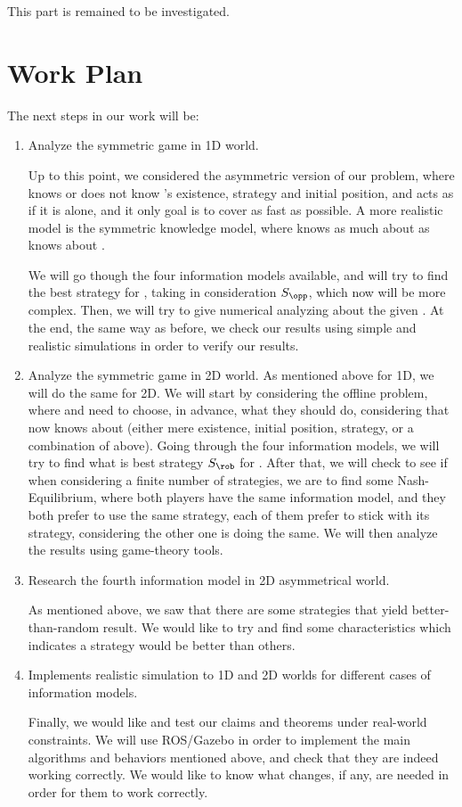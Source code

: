 \documentclass[a4paper,english,10pt]{article}
\begin{document}
This part is remained to be investigated. 

\section{Work Plan}
The next steps in our work will be:
\begin{enumerate}
\item Analyze the symmetric game in 1D world.

Up to this point, we considered the asymmetric version of our problem, where \rob knows or does not know {\opp}'s existence, strategy and initial position, and \opp acts as if it is alone, and it only goal is to cover as fast as possible.
A more realistic model is the symmetric knowledge model, where \opp knows as much about \rob as \rob knows about \opp.

We will go though the four information models available, and will try to find the best strategy for \rob, taking in consideration $S_\opp$, which now will be more complex. Then, we will try to give numerical analyzing about the given \fcc. At the end, the same way as before, we check our results using simple and realistic simulations in order to verify our results.

\item Analyze the symmetric game in 2D world.
As mentioned above for 1D, we will do the same for 2D.
We will start by considering the offline problem, where \rob and \opp need to choose, in advance, what they should do, considering that now \opp knows about \rob (either mere existence, initial position, strategy, or a combination of above).
Going through the four information models, we will try to find what is  best strategy $S_\rob$ for \rob. 
After that, we will check to see if when considering a finite number of strategies, we are to find some Nash-Equilibrium, where both players have the same information model, and they both prefer to use the same strategy, each of them prefer to stick with its strategy, considering the other one is doing the same. We will then analyze the results using game-theory tools.

\item Research the fourth information model in 2D asymmetrical world.

As mentioned above, we saw that there are some strategies that yield better-than-random result. 
We would like to try and find some characteristics which indicates a strategy would be better than others.

\item Implements realistic simulation to 1D and 2D worlds for different cases of information models.

Finally, we would like and test our claims and theorems under real-world constraints. We will use ROS/Gazebo in order to implement the main algorithms and behaviors mentioned above, and check that they are indeed working correctly.
We would like to know what changes, if any, are needed in order for them to work correctly.

\end{enumerate}




\end{document}
